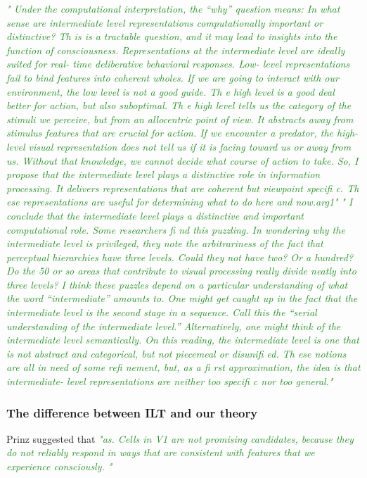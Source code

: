 \documentclass[utf8]{article}
\newcommand{\rewrite}[1]{\textcolor{ForestGreen}{\textit{"#1"}}}
\begin{document}
			
			\rewrite{
				Under the computational interpretation, the “why” question means: In what sense are intermediate level representations computationally important or distinctive? Th is is a tractable question, and it may lead to insights into the function of consciousness. Representations at the intermediate level are ideally suited for real- time deliberative behavioral responses. Low- level representations fail to bind features into coherent wholes. If we are going to interact with our environment, the low level is not a good guide. Th e high level is a good deal better for action, but also suboptimal. Th e high level tells us the category of the stimuli we perceive, but from an allocentric point of view. It abstracts away from stimulus features that are crucial for action. If we encounter a predator, the high- level visual representation does not tell us if it is facing toward us or away from us. Without that knowledge, we cannot decide what course of action to take. So, I propose that the intermediate level plays a distinctive role in information processing. It delivers representations that are coherent but viewpoint specifi c. Th ese representations are useful for determining what to do here and now.arg1} \cite{prinz2007intermediate}
			\rewrite{
				I conclude that the intermediate level plays a distinctive and important computational role. Some researchers fi nd this puzzling. In wondering why the intermediate level is privileged, they note the arbitrariness of the fact that perceptual hierarchies have three levels. Could they not have two? Or a hundred? Do the 50 or so areas that contribute to visual processing really divide neatly into three levels? I think these puzzles depend on a particular understanding of what the word “intermediate” amounts to. One might get caught up in the fact that the intermediate level is the second stage in a sequence. Call this the “serial understanding of the intermediate level.” Alternatively, one might think of the intermediate level semantically. On this reading, the intermediate level is one that is not abstract and categorical, but not piecemeal or disunifi ed. Th ese notions are all in need of some refi nement, but, as a fi rst approximation, the idea is that intermediate- level representations are neither too specifi c nor too general.}\cite{prinz2007intermediate}
			
			\subsubsection{The difference between ILT and our theory}
				Prinz suggested that \rewrite{as. Cells in V1 are not promising candidates, because they do not reliably respond in ways that are consistent with features that we experience consciously. } \cite{prinz2007intermediate}
				
\end{document}
